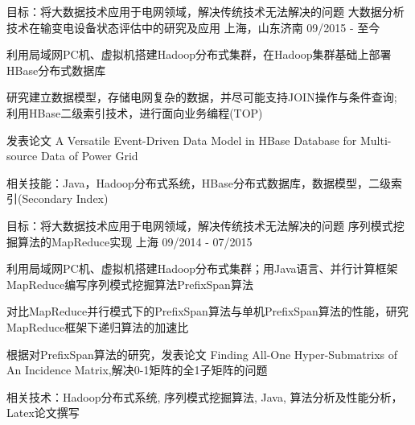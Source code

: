 \begin{cventries}
 
  \cventry
    {目标：将大数据技术应用于电网领域，解决传统技术无法解决的问题} %
    {大数据分析技术在输变电设备状态评估中的研究及应用} %
    {上海，山东济南} %
    {09/2015 - 至今} %
    {
      \begin{cvitems} %
        \item {利用局域网PC机、虚拟机搭建Hadoop分布式集群，在Hadoop集群基础上部署HBase分布式数据库}
        \item {研究建立数据模型，存储电网复杂的数据，并尽可能支持JOIN操作与条件查询; 利用HBase二级索引技术，进行面向业务编程(TOP)}
        \item{发表论文 A Versatile Event-Driven Data Model in HBase Database for Multi-source Data of Power Grid}
        \item{相关技能：Java，Hadoop分布式系统，HBase分布式数据库，数据模型，二级索引(Secondary Index) }
      \end{cvitems}
    }
    
    \cventry
    {目标：将大数据技术应用于电网领域，解决传统技术无法解决的问题} %
    {序列模式挖掘算法的MapReduce实现} %
    {上海} %
    {09/2014 - 07/2015} %
    {
      \begin{cvitems} %
        \item {利用局域网PC机、虚拟机搭建Hadoop分布式集群；用Java语言、并行计算框架MapReduce编写序列模式挖掘算法PrefixSpan算法}
        \item {对比MapReduce并行模式下的PrefixSpan算法与单机PrefixSpan算法的性能，研究MapReduce框架下递归算法的加速比}
        \item{根据对PrefixSpan算法的研究，发表论文 Finding All-One Hyper-Submatrixs of An Incidence Matrix,解决0-1矩阵的全1子矩阵的问题 }
        \item{相关技术：Hadoop分布式系统, 序列模式挖掘算法, Java, 算法分析及性能分析，Latex论文撰写}
      \end{cvitems}
    }


\end{cventries}
